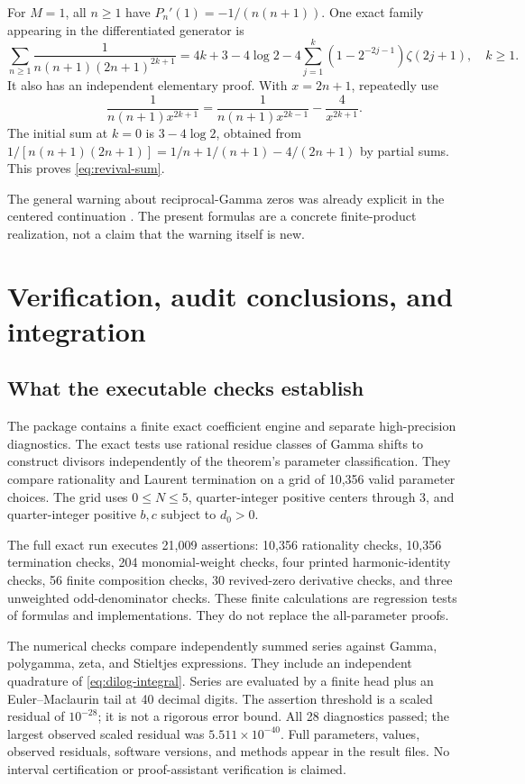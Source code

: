\documentclass[11pt,a4paper]{article}
\numberwithin{equation}{section}
\theoremstyle{definition}\newtheorem{definition}[theorem]{Definition}
\theoremstyle{remark}\newtheorem{remark}[theorem]{Remark}
\begin{document}
For $M=1$, all $n\ge1$ have $P_n'(1)=-1/(n(n+1))$.
One exact family appearing in the differentiated generator is
\begin{equation}
 \sum_{n\ge1}\frac1{n(n+1)(2n+1)^{2k+1}}
 =4k+3-4\log2
       -4\sum_{j=1}^k(1-2^{-2j-1})\zeta(2j+1),\quad k\ge1.
 \label{eq:revival-sum}
\end{equation}
It also has an independent elementary proof. With $x=2n+1$, repeatedly
use
\[
 \frac1{n(n+1)x^{2k+1}}
 =\frac1{n(n+1)x^{2k-1}}-\frac4{x^{2k+1}}.
\]
The initial sum at $k=0$ is $3-4\log2$, obtained from
$1/[n(n+1)(2n+1)]=1/n+1/(n+1)-4/(2n+1)$ by partial sums.
This proves \eqref{eq:revival-sum}.

The general warning about reciprocal-Gamma zeros was already explicit
in the centered continuation \cite{repo-centered}. The present formulas
are a concrete finite-product realization, not a claim that the warning
itself is new.

\section{Verification, audit conclusions, and integration}
\label{sec:verification}
\subsection{What the executable checks establish}
The package contains a finite exact coefficient engine and separate
high-precision diagnostics. The exact tests use rational residue classes
of Gamma shifts to construct divisors independently of the theorem's
parameter classification. They compare rationality and Laurent
termination on a grid of 10,356 valid parameter choices. The grid
uses $0\le N\le5$, quarter-integer positive centers through $3$, and
quarter-integer positive $b,c$ subject to $d_0>0$.

The full exact run executes 21,009 assertions: 10,356 rationality checks,
10,356 termination checks, 204 monomial-weight checks, four printed
harmonic-identity checks, 56 finite composition checks, 30 revived-zero
derivative checks, and three unweighted odd-denominator checks.
These finite calculations are regression tests of formulas and
implementations. They do not replace the all-parameter proofs.

The numerical checks compare independently summed series against Gamma,
polygamma, zeta, and Stieltjes expressions. They include an independent
quadrature of \eqref{eq:dilog-integral}. Series are evaluated by a finite
head plus an Euler--Maclaurin tail at 40 decimal digits. The assertion
threshold is a scaled residual of $10^{-28}$; it is not a rigorous error
bound. All 28 diagnostics passed; the largest observed scaled residual was
$5.511\times10^{-40}$. Full parameters, values, observed residuals,
software versions, and methods appear in the result files. No interval certification or
proof-assistant verification is claimed.
\end{document}
